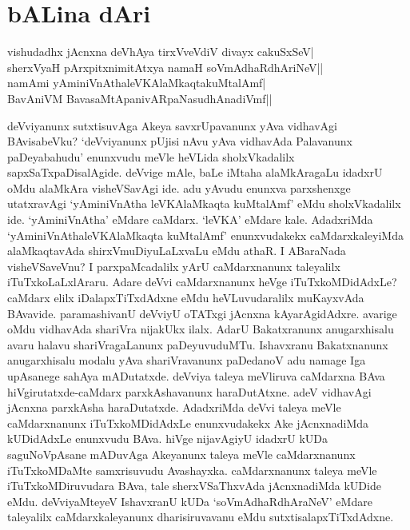 \chapter{bALina dAri}\label{chap1}


\begin{shloka}
vishudadhx jAcnxna deVhAya tirxVveVdiV divayx cakuSxSeV|\\
sherxVyaH pArxpitxnimitAtxya namaH soVmAdhaRdhAriNeV||\\
namAmi yAminiVnAthaleVKAlaMkaqtakuMtalAmf|\\
BavAniVM BavasaMtApanivARpaNasudhAnadiVmf||
\end{shloka}


deVviyanunx sutxtisuvAga Akeya savxrUpavanunx yAva vidhavAgi BAvisabeVku? `deVviyanunx pUjisi nAvu yAva 
vidhavAda Palavanunx paDeyabahudu' enunxvudu meVle heVLida sholxVkadalilx sapxSaTxpaDisalAgide. deVvige 
mAle, baLe iMtaha alaMkAragaLu idadxrU oMdu alaMkAra visheVSavAgi ide. adu yAvudu enunxva parxshenxge 
utatxravAgi `yAminiVnAtha leVKAlaMkaqta kuMtalAmf' eMdu sholxVkadalilx ide. `yAminiVnAtha' 
eMdare caMdarx. `leVKA' eMdare kale. AdadxriMda `yAminiVnAthaleVKAlaMkaqta kuMtalAmf' enunxvudakekx 
caMdarxkaleyiMda alaMkaqtavAda shirxVmuDiyuLaLxvaLu eMdu athaR. I ABaraNada visheVSaveVnu? I 
parxpaMcadalilx yArU caMdarxnanunx taleyalilx iTuTxkoLaLxlAraru. Adare deVvi caMdarxnanunx heVge iTuTxkoMDidAdxLe? caMdarx 
elilx iDalapxTiTxdAdxne eMdu heVLuvudaralilx muKayxvAda BAvavide. paramashivanU deVviyU oTATxgi 
jAcnxna kAyarAgidAdxre. avarige oMdu vidhavAda shariVra nijakUkx ilalx. AdarU Bakatxranunx anugarxhisalu 
avaru halavu shariVragaLanunx paDeyuvuduMTu. Ishavxranu Bakatxnanunx anugarxhisalu modalu yAva shariVravanunx 
paDedanoV adu namage Iga upAsanege sahAya mADutatxde. deVviya taleya meVliruva caMdarxna 
BAva hiVgirutatxde-caMdarx parxkAshavanunx haraDutAtxne. adeV vidhavAgi jAcnxna parxkAsha haraDutatxde. AdadxriMda deVvi 
taleya meVle caMdarxnanunx iTuTxkoMDidAdxLe enunxvudakekx Ake jAcnxnadiMda kUDidAdxLe enunxvudu BAva. hiVge 
nijavAgiyU idadxrU kUDa saguNoVpAsane mADuvAga Akeyanunx taleya meVle caMdarxnanunx iTuTxkoMDaMte 
samxrisuvudu Avashayxka. caMdarxnanunx taleya meVle iTuTxkoMDiruvudara BAva, tale sherxVSaThxvAda jAcnxnadiMda 
kUDide eMdu. deVviyaMteyeV IshavxranU kUDa `soVmAdhaRdhAraNeV' eMdare taleyalilx caMdarxkaleyanunx dharisiruvavanu eMdu sutxtisalapxTiTxdAdxne.

